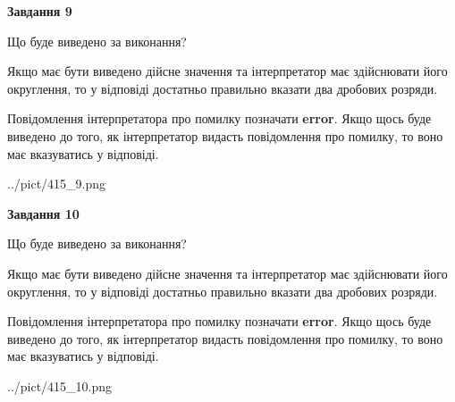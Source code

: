 \documentclass[12pt, ukrainian]{article}
\begin{document}
{\begin {Large}
{\begin {center}\textbf{Завдання 9}\end {center}}\par
Що буде виведено за виконання? \par

Якщо має бути виведено дійсне значення та інтерпретатор має здійснювати його округлення, 
то у відповіді достатньо правильно вказати два дробових розряди.

Повідомлення інтерпретатора про помилку позначати \textbf{error}.
Якщо щось буде виведено до того, як інтерпретатор видасть повідомлення про помилку, 
то воно має вказуватись у відповіді. \par

\begin{center}
	{../pict/415_9.png}
\end{center}
\newpage

{\begin {center}\textbf{Завдання 10}\end {center}}\par
Що буде виведено за виконання? \par

Якщо має бути виведено дійсне значення та інтерпретатор має здійснювати його округлення, 
то у відповіді достатньо правильно вказати два дробових розряди.

Повідомлення інтерпретатора про помилку позначати \textbf{error}.
Якщо щось буде виведено до того, як інтерпретатор видасть повідомлення про помилку, 
то воно має вказуватись у відповіді. \par

\begin{center}
	{../pict/415_10.png}
\end{center}
\newpage

\end {Large}}
\end{document}
